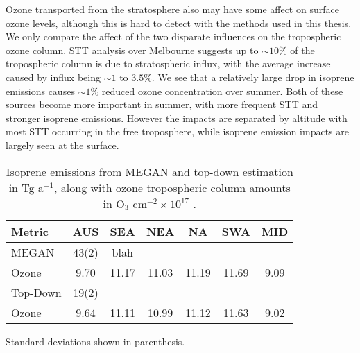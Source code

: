   Ozone transported from the stratosphere also may have some affect on surface ozone levels, although this is hard to detect with the methods used in this thesis.
  We only compare the affect of the two disparate influences on the tropospheric ozone column.
  STT analysis over Melbourne suggests up to $\sim 10\%$ of the tropospheric column is due to stratospheric influx, with the average increase caused by influx being $\sim 1$ to $3.5\%$.
  We see that a relatively large drop in isoprene emissions causes $\sim 1\%$ reduced ozone concentration over summer.
  Both of these sources become more important in summer, with more frequent STT and stronger isoprene emissions.
  However the impacts are separated by altitude with most STT occurring in the free troposphere, while isoprene emission impacts are largely seen at the surface.
  
  
  \begin{table}\begin{threeparttable}
    \caption{Isoprene emissions from MEGAN and top-down estimation in Tg a$^{-1}$, along with ozone tropospheric column amounts in O$_3$ cm$^{-2} \times 10^{17}$ .}
    \begin{tabular}{ l c c c c c c } 
      \toprule
      Metric & AUS & SEA & NEA & NA & SWA & MID \\
      \midrule
      MEGAN & 43(2) & blah &  &  & & \\
      Ozone & 9.70 & 11.17 & 11.03 & 11.19 & 11.69 & 9.09 \\
      \midrule
      Top-Down & 19(2) & & & & & \\
      Ozone & 9.64 & 11.11 & 10.99 & 11.12 & 11.63 & 9.02 \\
      \bottomrule
    \end{tabular}
    \begin{tablenotes}
      \item Standard deviations shown in parenthesis.
    \end{tablenotes}
    \label{Conclusions:ozone:tab_emissions_vs_ozone}
  \end{threeparttable}\end{table}

